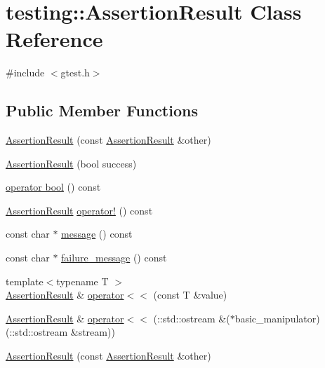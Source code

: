\hypertarget{classtesting_1_1_assertion_result}{\section{testing\-:\-:Assertion\-Result Class Reference}
\label{classtesting_1_1_assertion_result}
}


{\ttfamily \#include $<$gtest.\-h$>$}

\subsection*{Public Member Functions}
\begin{DoxyCompactItemize}
\item 
\hyperlink{classtesting_1_1_assertion_result_a27788116f03f90aec4daf592fd809ead}{Assertion\-Result} (const \hyperlink{classtesting_1_1_assertion_result}{Assertion\-Result} \&other)
\item 
\hyperlink{classtesting_1_1_assertion_result_ade695178c05c4b2f82e92930c912fc25}{Assertion\-Result} (bool success)
\item 
\hyperlink{classtesting_1_1_assertion_result_af85b7852e6399467cd74df539810abcd}{operator bool} () const 
\item 
\hyperlink{classtesting_1_1_assertion_result}{Assertion\-Result} \hyperlink{classtesting_1_1_assertion_result_a85301ba52aa1efe89b79d1e3b59160cd}{operator!} () const 
\item 
const char $\ast$ \hyperlink{classtesting_1_1_assertion_result_ab20c91eba13e20f1b4ad89e3d15f69a8}{message} () const 
\item 
const char $\ast$ \hyperlink{classtesting_1_1_assertion_result_ae54fa82506c507a9dbc0f85d2cec652a}{failure\-\_\-message} () const 
\item 
{\footnotesize template$<$typename T $>$ }\\\hyperlink{classtesting_1_1_assertion_result}{Assertion\-Result} \& \hyperlink{classtesting_1_1_assertion_result_a3230efa81aafe7c61f5fb878cfa39e91}{operator$<$$<$} (const T \&value)
\item 
\hyperlink{classtesting_1_1_assertion_result}{Assertion\-Result} \& \hyperlink{classtesting_1_1_assertion_result_a43ae8a260843ce2ff3dc9af262672b8b}{operator$<$$<$} (\-::std\-::ostream \&($\ast$basic\-\_\-manipulator)(\-::std\-::ostream \&stream))
\item 
\hyperlink{classtesting_1_1_assertion_result_a27788116f03f90aec4daf592fd809ead}{Assertion\-Result} (const \hyperlink{classtesting_1_1_assertion_result}{Assertion\-Result} \&other)

\end{DoxyCompactItemize}
